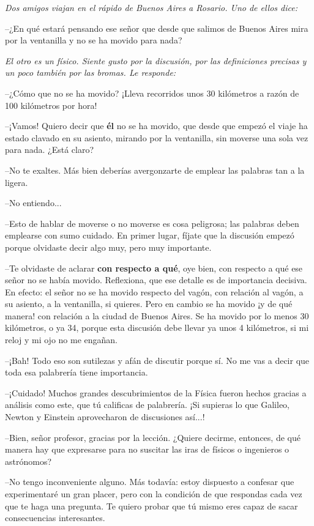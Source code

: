 {\small{
  {\it Dos amigos viajan en el rápido de Buenos Aires a Rosario. Uno de ellos dice:}
  
  --¿En qué estará pensando ese señor que desde que salimos de Buenos Aires mira por la ventanilla y no se ha movido para nada?
  
  {\it El otro es un físico. Siente gusto por la discusión, por las definiciones precisas y un poco también por las bromas. Le responde:}
  
  --¿Cómo que no se ha movido? ¡Lleva recorridos unos 30 kilómetros a razón de 100 kilómetros por hora!
  
  --¡Vamos! Quiero decir que {\bf él} no se ha movido, que desde que empezó el viaje ha estado clavado en su asiento, mirando por la ventanilla, sin moverse una sola vez para nada. ¿Está claro?
  
  --No te exaltes. Más bien deberías avergonzarte de emplear las palabras tan a la ligera.
  
  --No entiendo...
  
  --Esto de hablar de moverse o no moverse es cosa peligrosa; las palabras deben emplearse con sumo cuidado. En primer lugar, fíjate que la discusión empezó porque olvidaste decir algo muy, pero muy importante.
  
  --Te olvidaste de aclarar {\bf con respecto a qué}, oye bien, con respecto a qué ese señor no se había movido. Reflexiona, que ese detalle es de importancia decisiva. En efecto: el señor no se ha movido respecto del vagón, con relación al vagón, a su asiento, a la ventanilla, si quieres. Pero en cambio se ha movido ¡y de qué manera! con relación a la ciudad de Buenos Aires. Se ha movido por lo menos 30 kilómetros, o ya 34, porque esta discusión debe llevar ya unos 4 kilómetros, si mi reloj y mi ojo no me engañan.
  
  --¡Bah! Todo eso son sutilezas y afán de discutir porque sí. No me vas a decir que toda esa palabrería tiene importancia.
  
  --¡Cuidado! Muchos grandes descubrimientos de la Física fueron hechos gracias a análisis como este, que tú calificas de palabrería. ¡Si supieras lo que Galileo, Newton y Einstein aprovecharon de discusiones así...!
  
  --Bien, señor profesor, gracias por la lección. ¿Quiere decirme, entonces, de qué manera hay que expresarse para no suscitar las iras de físicos o ingenieros o astrónomos?
  
  --No tengo inconveniente alguno. Más todavía: estoy dispuesto a confesar que experimentaré un gran placer, pero con la condición de que respondas cada vez que te haga una pregunta. Te quiero probar que tú mismo eres capaz de sacar consecuencias interesantes.
  
}}

